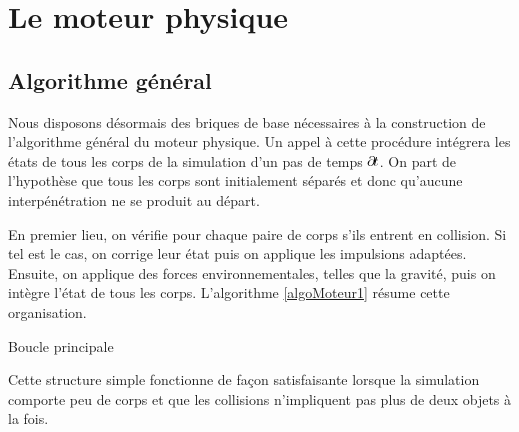 \section{Le moteur physique}

\subsection{Algorithme général}

Nous disposons désormais des briques de base nécessaires à la
construction de l'algorithme général du moteur physique. Un appel à
cette procédure intégrera les états de tous les corps de la simulation
d'un pas de temps $\partial \! t$. On part de l'hypothèse que tous les
corps sont initialement séparés et donc qu'aucune interpénétration ne
se produit au départ.

En premier lieu, on vérifie pour chaque paire de corps s'ils entrent
en collision. Si tel est le cas, on corrige leur état puis on applique
les impulsions adaptées. Ensuite, on applique des forces
environnementales, telles que la gravité, puis on intègre l'état de
tous les corps. L'algorithme \ref{algoMoteur1} résume cette
organisation.

\begin{algorithm}[h]
  \caption{Boucle principale}
  \label{algoMoteur1}
  \dontprintsemicolon
  \BlankLine
  \BlankLine
  \BlankLine
\end{algorithm}

Cette structure simple fonctionne de façon satisfaisante lorsque la
simulation comporte peu de corps et que les collisions n'impliquent
pas plus de deux objets à la fois.


